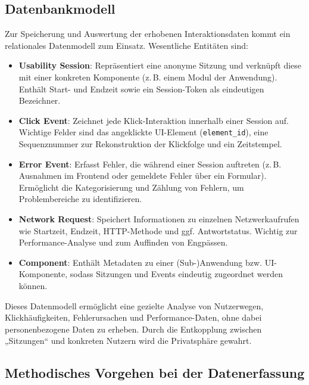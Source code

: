 \documentclass[12pt,oneside]{article}
\begin{document}
\subsection{Datenbankmodell}

Zur Speicherung und Auswertung der erhobenen Interaktionsdaten kommt ein relationales Datenmodell zum Einsatz. Wesentliche Entitäten sind:

\begin{itemize}
    \item \textbf{Usability Session}: Repräsentiert eine anonyme Sitzung und verknüpft diese mit einer konkreten Komponente (z.\,B. einem Modul der Anwendung). Enthält Start- und Endzeit sowie ein Session-Token als eindeutigen Bezeichner.
    \item \textbf{Click Event}: Zeichnet jede Klick-Interaktion innerhalb einer Session auf. Wichtige Felder sind das angeklickte UI-Element (\texttt{element\_id}), eine Sequenznummer zur Rekonstruktion der Klickfolge und ein Zeitstempel.
    \item \textbf{Error Event}: Erfasst Fehler, die während einer Session auftreten (z.\,B. Ausnahmen im Frontend oder gemeldete Fehler über ein Formular). Ermöglicht die Kategorisierung und Zählung von Fehlern, um Problembereiche zu identifizieren.
    \item \textbf{Network Request}: Speichert Informationen zu einzelnen Netzwerkaufrufen wie Startzeit, Endzeit, HTTP-Methode und ggf. Antwortstatus. Wichtig zur Performance-Analyse und zum Auffinden von Engpässen.
    \item \textbf{Component}: Enthält Metadaten zu einer (Sub-)Anwendung bzw. UI-Komponente, sodass Sitzungen und Events eindeutig zugeordnet werden können.
\end{itemize}

Dieses Datenmodell ermöglicht eine gezielte Analyse von Nutzerwegen, Klickhäufigkeiten, Fehlerursachen und Performance-Daten, ohne dabei personenbezogene Daten zu erheben. Durch die Entkopplung zwischen „Sitzungen“ und konkreten Nutzern wird die Privatsphäre gewahrt.

\subsection{Methodisches Vorgehen bei der Datenerfassung}
\end{document}
